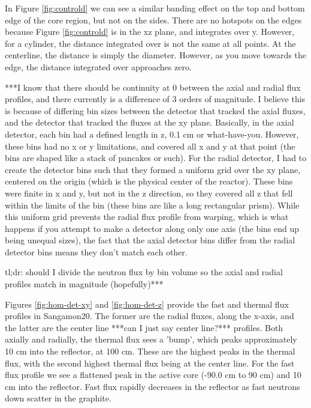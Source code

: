 In Figure \ref{fig:controld} we can see a similar banding effect on the top and bottom edge of the core region, but not on the sides.  There are no hotspots on the edges because Figure \ref{fig:controld} is in the xz plane, and integrates over y.  However, for a cylinder, the distance integrated over is not the same at all points.  At the centerline, the distance is simply the diameter.  However, as you move towards the edge, the distance integrated over approaches zero.




***I know that there should be continuity at 0 between the axial and radial flux profiles, and there currently is a difference of 3 orders of magnitude.  I believe this is because of differing bin sizes between the detector that tracked the axial fluxes, and the detector that tracked the fluxes at the xy plane.  Basically, in the axial detector, each bin had a defined length in z, 0.1 cm or what-have-you.  However, these bins had no x or y limitations, and covered all x and y at that point (the bins are shaped like a stack of pancakes or such).  For the radial detector, I had to create the detector bins such that they formed a uniform grid over the xy plane, centered on the origin (which is the physical center of the reactor).  These bins were finite in x and y, but not in the z direction, so they covered all z that fell within the limits of the bin (these bins are like a long rectangular prism).  While this uniform grid prevents the radial flux profile from warping, which is what happens if you attempt to make a detector along only one axis (the bins end up being unequal sizes), the fact that the axial detector bins differ from the radial detector bins means they don't match each other.

tl;dr: should I divide the neutron flux by bin volume so the axial and radial profiles match in magnitude (hopefully)***

Figures \ref{fig:hom-det-xy} and \ref{fig:hom-det-z} provide the fast and thermal flux profiles in Sangamon20.  The former are the radial fluxes, along the x-axis, and the latter are the center line ***can I just say center line?*** profiles.  Both axially and radially, the thermal flux sees a 'bump', which peaks approximately 10 cm into the reflector, at 100 cm.  These are the highest peaks in the thermal flux, with the second highest thermal flux being at the center line.  For the fast flux profile we see a flattened peak in the  active core (-90.0 cm to 90 cm) and 10 cm into the reflector.  Fast flux rapidly decreases in the reflector as fast neutrons down scatter in the graphite.

